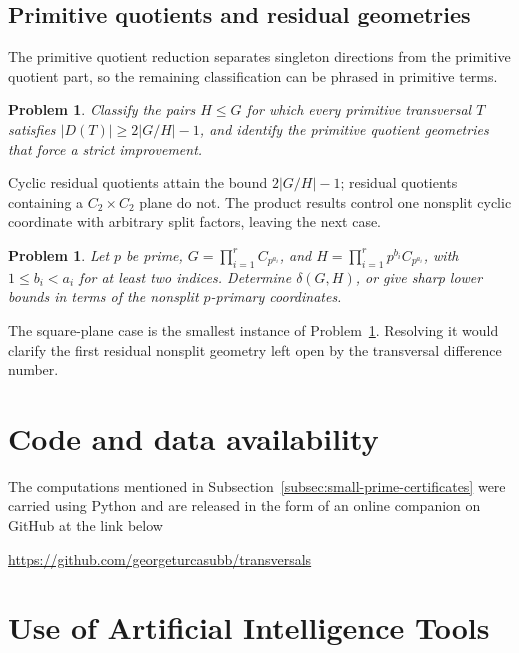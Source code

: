 \documentclass[reqno]{amsart}
\numberwithin{equation}{section}
\newtheorem{problem}[theorem]{Problem}
\theoremstyle{definition}
\begin{document}
\subsection{Primitive quotients and residual geometries}

The primitive quotient reduction separates singleton directions from the
primitive quotient part, so the remaining classification can be phrased in
primitive terms.

\begin{problem}
\label{prob:primitive-support}
Classify the pairs $H\leq G$ for which every primitive transversal $T$ satisfies
\(|D(T)|\geq 2|G/H|-1\), and identify the primitive quotient geometries that
force a strict improvement.
\end{problem}

Cyclic residual quotients attain the bound \(2|G/H|-1\); residual quotients
containing a \(C_2\times C_2\) plane do not.  The product results control one
nonsplit cyclic coordinate with arbitrary split factors, leaving the next case.

\begin{problem}
\label{prob:multiple-nonsplit-coordinates}
Let $p$ be prime, \(G=\prod_{i=1}^r C_{p^{a_i}}\), and
\(H=\prod_{i=1}^r p^{b_i}C_{p^{a_i}}\), with \(1\leq b_i<a_i\) for at least two
indices.  Determine \(\delta(G,H)\), or give sharp lower bounds in terms of the
nonsplit \(p\)-primary coordinates.
\end{problem}

The square-plane case is the smallest instance of
Problem~\ref{prob:multiple-nonsplit-coordinates}.  Resolving it would clarify
the first residual nonsplit geometry left open by the transversal difference
number.


\section*{Code and data availability}

The computations mentioned in
Subsection~\ref{subsec:small-prime-certificates} were carried using Python and are released in the form of an online companion on GitHub at the link below
\begin{center}
\url{https://github.com/georgeturcasubb/transversals} 
\end{center}

\section*{Use of Artificial Intelligence Tools}
\end{document}
